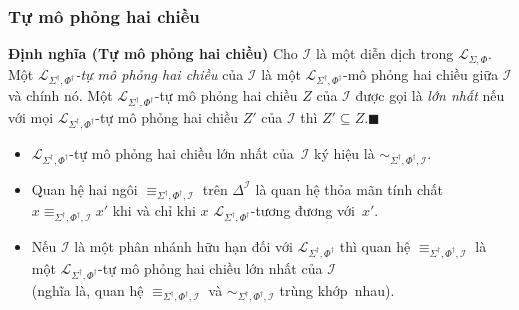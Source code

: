 \documentclass[notheorems,xcolor=dvipsnames]{beamer}
\newcommand{\mL}		{\mathcal{L}}
\newcommand{\mI}		{\mathcal{I}}
\newcommand{\SigmaDag}	{\Sigma^\dag}
\newcommand{\SigmaDagI}	{\Sigma^\dag_I}
\newcommand{\PhiDag}	{\Phi^\dag}
\newcommand{\mLSP}		{\mL_{\Sigma,\Phi}}
\newcommand{\mLSPD}		{\mL_{\Sigma^\dag,\Phi^\dag}}
\newcommand{\SdPdI}		{{\SigmaDag,\Phi^\dag,\mI}}
\newcommand{\myend}		{\mbox{}\hfill\mbox{{\tiny$\!\blacksquare$}}}
\newcommand{\tuple}[1]	{\left\langle#1\right\rangle\!}
\begin{document}

\begin{frame}\frametitle{\bf Tự mô phỏng hai chiều}
	\begin{block}{\bf Định nghĩa (Tự mô phỏng hai chiều)}
		Cho $\mI$ là một diễn dịch trong $\mLSP$. Một {\em $\mLSPD$-tự mô phỏng hai chiều} của $\mI$ là một $\mLSPD$-mô phỏng hai chiều giữa $\mI$ và chính nó. Một $\mLSPD$-tự mô phỏng hai chiều $Z$ của $\mI$ được gọi là {\em lớn nhất} nếu với mọi $\mLSPD$-tự mô phỏng hai chiều $Z'$ của $\mI$ thì $Z' \subseteq Z$.\myend
	\end{block}
	
	\begin{itemize}
		\setlength{\itemsep}{1.5ex}
		\item $\mLSPD$-tự mô phỏng hai chiều lớn nhất của~$\mI$ ký hiệu là $\sim_\SdPdI$.
		
		\item Quan hệ hai ngôi $\equiv_\SdPdI$ trên $\Delta^\mI$ là quan hệ thỏa mãn tính chất $x \equiv_\SdPdI x'$ khi và chỉ khi $x$ $\mLSPD$-tương đương với~$x'$.
		
		\item Nếu $\mI$ là một phân nhánh hữu hạn đối với $\mLSPD$ thì quan hệ $\equiv_\SdPdI$ là một $\mLSPD$-tự mô phỏng hai chiều lớn nhất của $\mI$\\
		(nghĩa là, quan hệ $\equiv_\SdPdI$ và $\sim_\SdPdI$ trùng khớp~nhau).
	\end{itemize}	
\end{frame}
\end{document}
